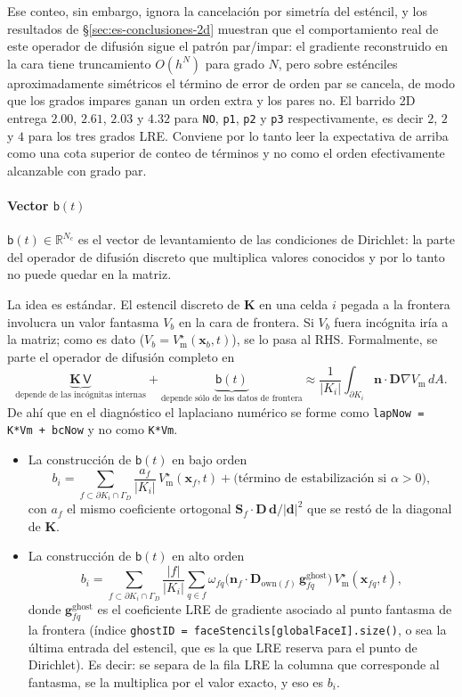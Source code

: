 \documentclass[11pt,a4paper]{article}
\newcommand{\code}[1]{\texttt{\small #1}}
\newcommand{\Vm}{V_{\text{m}}}
\newcommand{\Dten}{\mathbf{D}}
\newcommand{\grad}{\nabla}
\newcommand{\Kstif}{\mathbf{K}}
\newcommand{\R}{\mathbb{R}}
\begin{document}
Ese conteo, sin embargo, ignora la cancelación por simetría del esténcil, y los resultados de
\S\ref{sec:es-conclusiones-2d} muestran que el comportamiento real de este operador de difusión
sigue el patrón par/impar: el gradiente reconstruido en la cara tiene truncamiento $O(h^N)$
para grado $N$, pero sobre esténciles aproximadamente simétricos el término de error de orden
par se cancela, de modo que los grados impares ganan un orden extra y los pares no. El barrido
2D entrega $2.00$, $2.61$, $2.03$ y $4.32$ para \code{NO}, \code{p1}, \code{p2} y \code{p3}
respectivamente, es decir $2$, $2$ y $4$ para los tres grados LRE. Conviene por lo tanto leer
la expectativa de arriba como una cota superior de conteo de términos y no como el orden
efectivamente alcanzable con grado par.

\paragraph{Vector $\mathsf{b}(t)$ }
$\mathsf{b}(t)\in\R^{N_c}$ es el vector de levantamiento de las condiciones de Dirichlet: la parte del operador de difusión discreto que multiplica valores conocidos y por lo tanto no puede quedar en la matriz.

La idea es estándar. El estencil discreto de $\Kstif$ en una celda $i$ pegada a la frontera involucra un valor fantasma $V_b$ en la cara de frontera. Si $V_b$ fuera incógnita iría a la matriz; como es dato ($V_b=\Vm^\star(\mathbf{x}_b,t)$), se lo pasa al RHS. Formalmente, se parte el operador de difusión completo en
$$
\underbrace{\Kstif\,\mathsf{V}}_{\text{depende de las incógnitas internas}} +\underbrace{\mathsf{b}(t)}_{\text{depende sólo de los datos de frontera}} \approx \frac{1}{|K_i|}\int_{\partial K_i}\mathbf{n}\cdot\Dten\grad\Vm\,dA .
$$
De ahí que en el diagnóstico el laplaciano numérico se forme como \code{lapNow = K*Vm + bcNow} y no como \code{K*Vm}.

\begin{itemize}
\item La construcción de $\mathsf{b}(t)$ en bajo orden
$$
b_i = \sum_{f\subset\partial K_i\cap\Gamma_D}\frac{a_f}{|K_i|}\,\Vm^\star(\mathbf{x}_f,t)+\text{(término de estabilización si }\alpha>0),
$$
con $a_f$ el mismo coeficiente ortogonal $\mathbf{S}_f\cdot\Dten\,\mathbf{d}/|\mathbf{d}|^2$ que se restó de la diagonal de $\Kstif$.
\item  La construcción de $\mathsf{b}(t)$ en alto orden
$$
b_i = \sum_{f\subset\partial K_i\cap\Gamma_D}\frac{|f|}{|K_i|}\sum_{q\in f}\omega_{fq}\Big(\mathbf{n}_f\cdot\Dten_{\mathrm{own}(f)}\,\mathbf{g}^{\text{ghost}}_{fq}\Big)\,\Vm^\star(\mathbf{x}_{fq},t),
$$
donde $\mathbf{g}^{\text{ghost}}_{fq}$ es el coeficiente LRE de gradiente asociado al punto fantasma de la frontera (índice \code{ghostID = faceStencils[globalFaceI].size()}, o sea la última entrada del estencil, que es la que LRE reserva para el punto de Dirichlet). Es decir: se separa de la fila LRE la columna que corresponde al fantasma, se la multiplica por el valor exacto, y eso es $b_i$.
\end{itemize}
\end{document}
